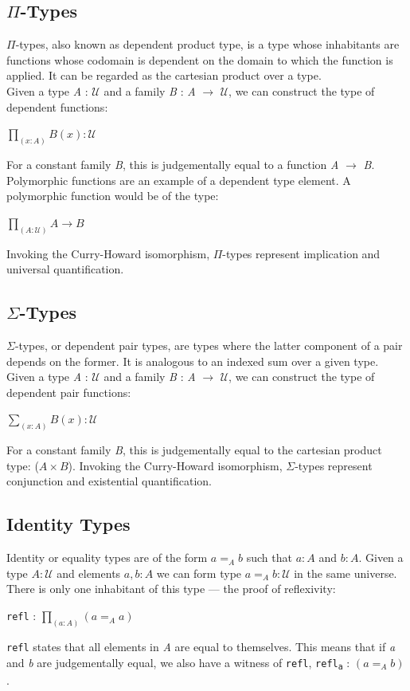 \documentclass[12pt]{report}
\begin{document}
\subsection*{$\Pi$-Types}
$\Pi$-types, also known as dependent product type, is a type whose inhabitants are functions whose codomain is dependent on the domain to which the function is applied. It can be regarded as the cartesian product over a type.\\
Given a type \textit{A} : $\mathcal{U}$ and a family \textit{B} : \textit{A} $\rightarrow$ $\mathcal{U}$, we can construct the type of dependent functions:
\begin{center}
$ \prod_{(x:A)}^{} B(x) : \mathcal{U} $
\end{center}
For a constant family \textit{B}, this is judgementally equal to a function \textit{A} $\rightarrow$ \textit{B}.\\
Polymorphic functions are an example of a dependent type element. A polymorphic function would be of the type:
\begin{center}
$ \prod_{(A:\mathcal{U})}^{} A \rightarrow B $
\end{center}
Invoking the Curry-Howard isomorphism, $\Pi$-types represent implication and universal quantification.


\subsection*{$\Sigma$-Types}
$\Sigma$-types, or dependent pair types, are types where the latter component of a pair depends on the former. It is analogous to an indexed sum over a given type. 
Given a type \textit{A} : $\mathcal{U}$ and a family \textit{B} : \textit{A} $\rightarrow$ $\mathcal{U}$, we can construct the type of dependent pair functions:
\begin{center}
$ \sum_{(x:A)}^{} B(x) : \mathcal{U} $
\end{center}
For a constant family \textit{B}, this is judgementally equal to the cartesian product type: ($A \times B$).
Invoking the Curry-Howard isomorphism, $\Sigma$-types represent conjunction and existential quantification.
\subsection*{Identity Types}
Identity or equality types are of the form $a =_A b$ such that $a : A$ and $b : A$. Given a type $A : \mathcal{U}$ and elements $a,b : A$ we can form type $a =_A b : \mathcal{U}$ in the same universe. There is only one inhabitant of this type --- the proof of reflexivity:
\begin{center}
 \texttt{refl} : $\prod_{(a:A)}^{} (a =_A a) $
\end{center}
\texttt{refl} states that all elements in \textit{A} are equal to themselves. This means that if \textit{a} and \textit{b} are judgementally equal, we also have a witness of \texttt{refl},  \texttt{refl\textsubscript{a}} : $(a =_A b)$.
\end{document}
